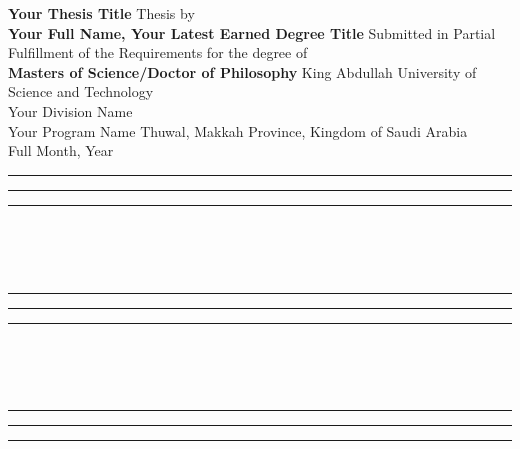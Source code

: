 \documentclass[onecolumn, 12 pt, doublespace, fullpage, letterpaper]{report}
\begin{document}
\vspace{2pt}
\thispagestyle{empty}
\addvspace{10mm}

\begin{center}
{\bf\Large Your Thesis Title}\vfill
{\Large Thesis by}\\
{\bf\Large Your Full Name, Your Latest Earned Degree Title}\vfill
{\Large Submitted in Partial Fulfillment of the Requirements for the degree of}\\
{\bf\Large Masters of Science/Doctor of Philosophy}\vfill
{King Abdullah University of Science and Technology}\\\vspace{2pt}
{Your Division Name}\\\vspace{2pt}
{Your Program Name}\vfill
{Thuwal, Makkah Province, Kingdom of Saudi Arabia}\\
{Full Month, Year}\vfill

\end{center}

\newpage
{}\vfill

\begin{flushleft}
\rule{15em}{1pt} \hfill \rule{10em}{1pt} \hfill \rule{6em}{1pt} \\\vspace{-5pt}
 \hfill {} \hfill {}\\\vspace{-5pt}
\\\vspace{5em}

\rule{15em}{1pt} \hfill \rule{10em}{1pt} \hfill \rule{6em}{1pt} \\\vspace{-5pt}
 \hfill {} \hfill {}\\\vspace{-5pt}
\\\vspace{5em}

\rule{15em}{1pt} \hfill \rule{10em}{1pt} \hfill \rule{6em}{1pt} \\\vspace{-5pt}
 \hfill {} \hfill {}\\\vspace{-5pt}
\end{flushleft}\vfill
\end{document}
